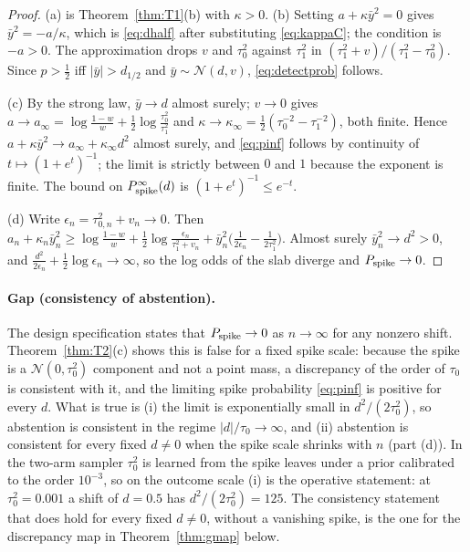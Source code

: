 \documentclass[11pt]{article}
\newcommand{\Normal}{\mathcal{N}}
\theoremstyle{definition}
\theoremstyle{plain}
\begin{document}
{\begin{proof}
(a) is Theorem~\ref{thm:T1}(b) with $\kappa>0$. (b) Setting $a+\kappa\bar y^2=0$ gives $\bar y^2=-a/\kappa$, which is \eqref{eq:dhalf} after substituting \eqref{eq:kappaC}; the condition is $-a>0$. The approximation drops $v$ and $\tau_0^2$ against $\tau_1^2$ in $(\tau_1^2+v)/(\tau_1^2-\tau_0^2)$. Since $p>\tfrac12$ iff $|\bar y|>d_{1/2}$ and $\bar y\sim\Normal(d,v)$, \eqref{eq:detectprob} follows.

(c) By the strong law, $\bar y\to d$ almost surely; $v\to0$ gives $a\to a_\infty=\log\frac{1-w}{w}+\frac{1}{2}\log\frac{\tau_0^2}{\tau_1^2}$ and $\kappa\to\kappa_\infty=\frac{1}{2}(\tau_0^{-2}-\tau_1^{-2})$, both finite. Hence $a+\kappa\bar y^2\to a_\infty+\kappa_\infty d^2$ almost surely, and \eqref{eq:pinf} follows by continuity of $t\mapsto(1+e^t)^{-1}$; the limit is strictly between $0$ and $1$ because the exponent is finite. The bound on $P_{\mathrm{spike}}^\infty(d)$ is $(1+e^t)^{-1}\le e^{-t}$.

(d) Write $\epsilon_n=\tau_{0,n}^2+v_n\to0$. Then $a_n+\kappa_n\bar y_n^2\ge\log\frac{1-w}{w}+\frac{1}{2}\log\frac{\epsilon_n}{\tau_1^2+v_n}+\bar y_n^2\bigl(\frac{1}{2\epsilon_n}-\frac{1}{2\tau_1^2}\bigr)$. Almost surely $\bar y_n^2\to d^2>0$, and $\frac{d^2}{2\epsilon_n}+\frac{1}{2}\log\epsilon_n\to\infty$, so the log odds of the slab diverge and $P_{\mathrm{spike}}\to0$.
\end{proof}

\paragraph{Gap (consistency of abstention).}
The design specification states that $P_{\mathrm{spike}}\to0$ as $n\to\infty$ for any nonzero shift. Theorem~\ref{thm:T2}(c) shows this is false for a fixed spike scale: because the spike is a $\Normal(0,\tau_0^2)$ component and not a point mass, a discrepancy of the order of $\tau_0$ is consistent with it, and the limiting spike probability \eqref{eq:pinf} is positive for every $d$. What is true is (i) the limit is exponentially small in $d^2/(2\tau_0^2)$, so abstention is consistent in the regime $|d|/\tau_0\to\infty$, and (ii) abstention is consistent for every fixed $d\ne0$ when the spike scale shrinks with $n$ (part (d)). In the two-arm sampler $\tau_0^2$ is learned from the spike leaves under a prior calibrated to the order $10^{-3}$, so on the outcome scale (i) is the operative statement: at $\tau_0^2=0.001$ a shift of $d=0.5$ has $d^2/(2\tau_0^2)=125$. The consistency statement that does hold for every fixed $d\ne0$, without a vanishing spike, is the one for the discrepancy map in Theorem~\ref{thm:gmap} below.

}
\end{document}
